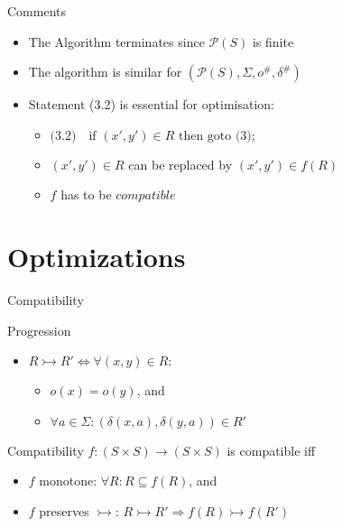 \documentclass[compress]{beamer}
\begin{document}
\begin{frame}{Comments}
  \begin{itemize}
    \item The Algorithm terminates since $\mathcal{P}(S)$ is finite
    \item The algorithm is similar for $(\mathcal{P}(S), \Sigma, o^\#, \delta^\#)$
    \item Statement (3.2) is essential for optimisation:\\
      \begin{itemize}
        \item $\text{(3.2)}\quad \text{if } (x', y') \in R \text{ then goto (3)};$
        \item $(x', y') \in R$ can be replaced by $(x', y') \in f(R)$
        \item $f$ has to be $compatible$
      \end{itemize}
  \end{itemize}
\end{frame}

\section{Optimizations}

\begin{frame}{Compatibility}
  \begin{block}{Progression}
    \begin{itemize}
      \item $R \rightarrowtail R' \Leftrightarrow \forall (x, y) \in R:$\\
        \begin{itemize}
          \item $o(x) = o(y)$, and
          \item $\forall a \in \Sigma: (\delta(x, a), \delta(y, a)) \in R'$
        \end{itemize}
    \end{itemize}
  \end{block}

  \begin{block}{Compatibility}
    $f : (S \times S) \to (S \times S)$ is compatible iff \\
    \begin{itemize}
      \item $f$ monotone: $\forall R: R \subseteq f(R)$, and
      \item $f$ preserves $\rightarrowtail$:
        $R \rightarrowtail R' \Rightarrow f(R) \rightarrowtail f(R')$
    \end{itemize}
  \end{block}
\end{frame}
\end{document}
